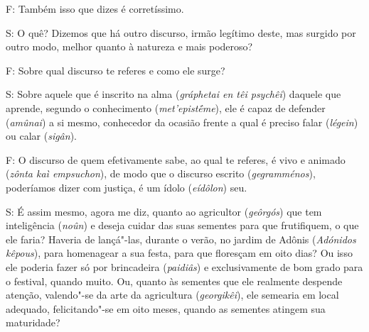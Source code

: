  

F: Também isso que dizes é corretíssimo.

 

\bekker{[276a]} S: O quê? Dizemos que há outro discurso, irmão legítimo
deste, mas surgido por outro modo, melhor quanto à natureza e mais
poderoso?

F: Sobre qual discurso te referes e como ele surge?

 

S: Sobre aquele que é inscrito na alma (\emph{gráphetai en têi psychêi})
daquele que aprende, segundo o conhecimento (\emph{met'epistḗme}), ele é
capaz de defender (\emph{amûnai}) a si mesmo, conhecedor da ocasião
frente a qual é preciso falar (\emph{légein}) ou calar (\emph{sigân}).

 

F: O discurso de quem efetivamente sabe, ao qual te referes, é vivo e
animado (\emph{zônta kaì empsuchon}), de modo que o discurso escrito
(\emph{gegramménos}), poderíamos dizer com justiça, é um ídolo
(\emph{eídôlon}) seu.

 

\bekker{[276b]} S: É assim mesmo, agora me diz, quanto ao agricultor
(\emph{geôrgós}) que tem inteligência (\emph{noûn}) e deseja cuidar das
suas sementes para que frutifiquem, o que ele faria? Haveria de
lançá"-las, durante o verão, no jardim de Adônis (\emph{Adónidos
kêpous}), para homenagear a sua festa, para que floresçam em oito dias?
Ou isso ele poderia fazer só por brincadeira (\emph{paidiâs}) e
exclusivamente de bom grado para o festival, quando muito. Ou, quanto às
sementes que ele realmente despende atenção, valendo"-se da arte da
agricultura (\emph{georgikêi}), ele semearia em local adequado,
felicitando"-se em oito meses, quando as sementes atingem sua maturidade?

